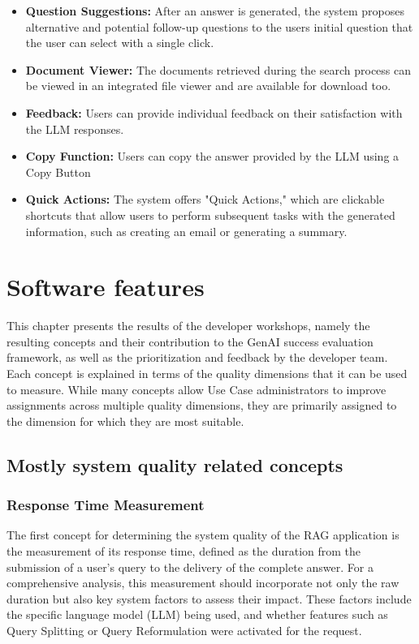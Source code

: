 \documentclass[
	english,
	ruledheaders=section,%
	class=report,%
	thesis={type=bachelor},%
	accentcolor=1b,%
	custommargins=true,%
	marginpar=false,%
	parskip=half-,%
	fontsize=11pt,%
	DIV=14,
]{tudapub}
\begin{document}
\begin{itemize}
    \item \textbf{Question Suggestions:} After an answer is generated, the system proposes alternative and potential follow-up questions to the users initial question that the user can select with a single click.
    
    \item \textbf{Document Viewer:} The documents retrieved during the search process can be viewed in an integrated file viewer and are available for download too.
    
    \item \textbf{Feedback:} Users can provide individual feedback on their satisfaction with the LLM responses.

    \item \textbf{Copy Function:} Users can copy the answer provided by the LLM using a Copy Button
    
    \item \textbf{Quick Actions:} The system offers "Quick Actions," which are clickable shortcuts that allow users to perform subsequent tasks with the generated information, such as creating an email or generating a summary.
\end{itemize}
\section{Software features}
This chapter presents the results of the developer workshops, namely the resulting concepts and their contribution to the GenAI success evaluation framework, as well as the prioritization and feedback by the developer team. Each concept is explained in terms of the quality dimensions that it can be used to measure. While many concepts allow Use Case administrators to improve assignments across multiple quality dimensions, they are primarily assigned to the dimension for which they are most suitable.
\subsection{Mostly system quality related concepts}
\subsubsection{Response Time Measurement}
The first concept for determining the system quality of the RAG application is the measurement of its response time, defined as the duration from the submission of a user's query to the delivery of the complete answer. For a comprehensive analysis, this measurement should incorporate not only the raw duration but also key system factors to assess their impact. These factors include the specific language model (LLM) being used, and whether features such as Query Splitting or Query Reformulation were activated for the request.
\end{document}
